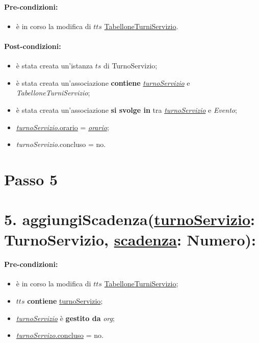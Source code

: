 \paragraph{Pre-condizioni:}
\begin{itemize}
    \item è in corso la modifica di $tts$ \underline{TabelloneTurniServizio}.
\end{itemize}

\paragraph{Post-condizioni:}
\begin{itemize}
   \item è stata creata un'istanza $ts$ di TurnoServizio;
    \item è stata creata un'associazione \textbf{contiene} \underline{\textit{turnoServizio}} e \textit{TabelloneTurniServizio};
   \item è stata creata un'associazione \textbf{si svolge in} tra \underline{\textit{turnoServizio}} e \textit{Evento};
    \item \underline{\textit{turnoServizio}.orario} = \underline{\textit{orario}};
    \item \textit{turnoServizio}.concluso  = no.
\end{itemize}


\section{Passo 5}
\section*{5. aggiungiScadenza(\underline{turnoServizio}: TurnoServizio, \underline{scadenza}: Numero):}

\paragraph{Pre-condizioni:}
\begin{itemize}
\item è in corso la modifica di $tts$ \underline{TabelloneTurniServizio};
 \item $tts$ \textbf{contiene} \underline{turnoServizio};
     \item \underline{\textit{turnoServizio}} è \textbf{gestito da} {\textit{org}};
   \item \underline{\textit{turnoServizo}.concluso} = no.
\end{itemize}

